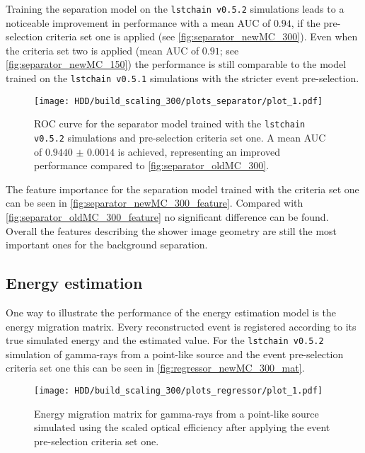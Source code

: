 Training the separation model on the \texttt{lstchain v0.5.2} simulations leads to a noticeable improvement in performance with a mean AUC of $\num{0.94}$, 
if the pre-selection criteria set one is applied (see \autoref{fig:separator_newMC_300}). 
Even when the criteria set two is applied (mean AUC of $\num{0.91}$; see \autoref{fig:separator_newMC_150}) 
the performance is still comparable to the model trained on the \texttt{lstchain v0.5.1} simulations with the stricter event pre-selection.
\begin{figure}
    \centering
    \texttt{[image: HDD/build\_scaling\_300/plots\_separator/plot\_1.pdf]}
    \caption{ROC curve for the separator model trained with the \texttt{lstchain v0.5.2} simulations and pre-selection criteria set one.
        A mean AUC of $\num{0.9440(14)}$ is achieved, representing an improved performance compared to \autoref{fig:separator_oldMC_300}.
    }
    \label{fig:separator_newMC_300}
\end{figure}

The feature importance for the separation model trained with the criteria set one can be seen in \autoref{fig:separator_newMC_300_feature}.
Compared with \autoref{fig:separator_oldMC_300_feature} no significant difference can be found.
Overall the features describing the shower image geometry are still the most important ones for the background separation.


\subsection{Energy estimation}
One way to illustrate the performance of the energy estimation model is the energy migration matrix.
Every reconstructed event is registered according to its true simulated energy and the estimated value.
For the \texttt{lstchain v0.5.2} simulation of gamma-rays from a point-like source and the event pre-selection criteria set one this can be seen in 
\autoref{fig:regressor_newMC_300_mat}.
\begin{figure}
    \centering
    \texttt{[image: HDD/build\_scaling\_300/plots\_regressor/plot\_1.pdf]}
    \caption{Energy migration matrix for gamma-rays from a point-like source simulated using the scaled optical efficiency after applying the 
        event pre-selection criteria set one.
    }
    \label{fig:regressor_newMC_300_mat}
\end{figure}

